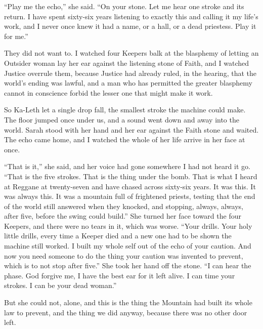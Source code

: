 ``Play me the echo,'' she said. ``On your stone. Let me hear one stroke and its return. I have spent sixty-six years listening to exactly this and calling it my life's work, and I never once knew it had a name, or a hall, or a dead priestess. Play it for me.''\par

\ornament

They did not want to. I watched four Keepers balk at the blasphemy of letting an Outsider woman lay her ear against the listening stone of Faith, and I watched Justice overrule them, because Justice had already ruled, in the hearing, that the world's ending was lawful, and a man who has permitted the greater blasphemy cannot in conscience forbid the lesser one that might make it work.\par

So Ka-Leth let a single drop fall, the smallest stroke the machine could make. The floor jumped once under us, and a sound went down and away into the world. Sarah stood with her hand and her ear against the Faith stone and waited. The echo came home, and I watched the whole of her life arrive in her face at once.\par

``That is it,'' she said, and her voice had gone somewhere I had not heard it go. ``That is the five strokes. That is the thing under the bomb. That is what I heard at Reggane at twenty-seven and have chased across sixty-six years. It was this. It was always this. It was a mountain full of frightened priests, testing that the end of the world still answered when they knocked, and stopping, always, always, after five, before the swing could build.'' She turned her face toward the four Keepers, and there were no tears in it, which was worse. ``Your drills. Your holy little drills, every time a Keeper died and a new one had to be shown the machine still worked. I built my whole self out of the echo of your caution. And now you need someone to do the thing your caution was invented to prevent, which is to not stop after five.'' She took her hand off the stone. ``I can hear the phase. God forgive me, I have the best ear for it left alive. I can time your strokes. I can be your dead woman.''\par

\ornament

But she could not, alone, and this is the thing the Mountain had built its whole law to prevent, and the thing we did anyway, because there was no other door left.\par

